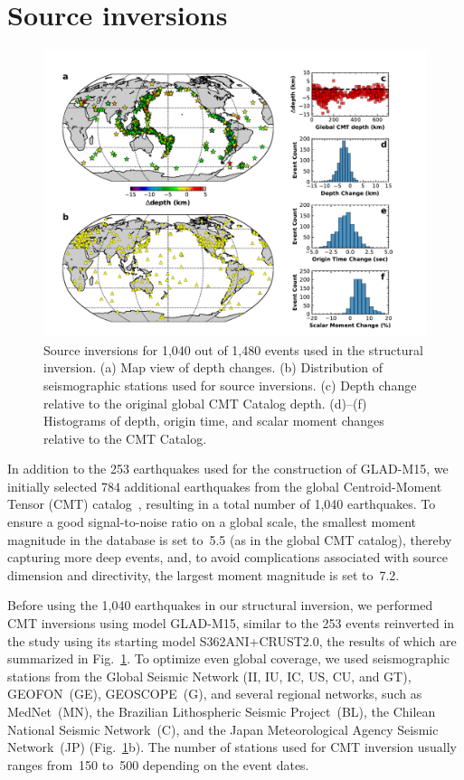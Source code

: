 \documentclass[extra,mreferee]{gji}
\begin{document}
\section{Source inversions}
\label{section:earthquakes}

\begin{figure}
  \centering
  \includegraphics[width=\textwidth]{figures/source_corrections.pdf}
  \caption{\small{Source inversions for 1,040 out of 1,480 events used in the structural inversion. (a) Map view of depth changes. (b) Distribution of seismographic stations used for source inversions. (c) Depth change relative to the original global CMT Catalog depth. (d)--(f) Histograms of depth, origin time, and scalar moment changes relative to the CMT Catalog.
  }}
  \label{fig:source_correction}
\end{figure}

In addition to the 253 earthquakes used for the construction of GLAD-M15, we initially selected 784 additional earthquakes
from the global Centroid-Moment Tensor (CMT) catalog~\citep[e.g.,][]{ekstrom2012global},
resulting in a total number of 1,040 earthquakes.
To ensure a good signal-to-noise ratio on a global scale,
the smallest moment magnitude in the database is set to~5.5 (as in the global CMT catalog),
thereby capturing more deep events,
and, to avoid complications associated with source dimension and directivity,
the largest moment magnitude is set to~7.2.

Before using the 1,040 earthquakes in our structural inversion,
we performed CMT inversions using model GLAD-M15, similar to the 253 events reinverted in the \citet{bozdaug2016global} study using its starting model S362ANI+CRUST2.0,
the results of which are summarized in Fig.~\ref{fig:source_correction}.
To optimize even global coverage,
we used seismographic stations from the  Global Seismic Network (II, IU, IC, US, CU, and GT),
GEOFON~(GE), GEOSCOPE~(G), and several regional networks, such as MedNet~(MN),
the Brazilian Lithospheric Seismic Project~(BL), the Chilean National Seismic Network~(C),
and the Japan Meteorological Agency Seismic Network~(JP) (Fig.~\ref{fig:source_correction}b).
The number of stations used for CMT inversion usually ranges
from~150 to~500 depending on the event dates.
\end{document}
